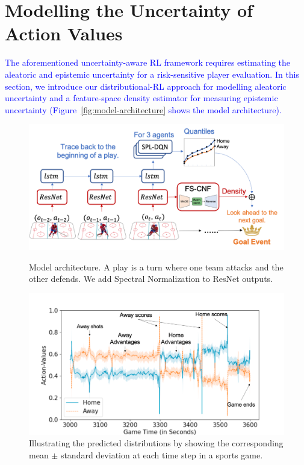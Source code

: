 \documentclass{article}
\begin{document}
\section{Modelling the Uncertainty of Action Values }\label{Sec:action-value-function}
\vspace{-0.05in}
\textcolor{blue}{The aforementioned uncertainty-aware RL framework requires estimating the aleatoric and epistemic uncertainty for a risk-sensitive player evaluation. In this section, we introduce our distributional-RL approach for modelling aleatoric uncertainty and a feature-space density estimator for measuring epistemic uncertainty (Figure~\ref{fig:model-architecture} shows the model architecture).}
\begin{figure}[htbp]
\vspace{-0.15in}
\begin{minipage}[t]{0.51\textwidth}
    \hspace{-0.25in}\includegraphics[scale=0.35]{figures/ice-hockey-net.png}
    \captionsetup{width=.95\linewidth}
    \caption{Model architecture. A play is a turn where one team attacks and the other defends. We add Spectral Normalization to ResNet outputs.}
    \label{fig:model-architecture}
\end{minipage}%
\begin{minipage}[t]{0.49\textwidth}
    \centering
    \includegraphics[scale=0.24]{figures/temporal-visualization-marked.png}
    \captionsetup{width=.95\linewidth}
    \caption{Illustrating the predicted distributions by showing the corresponding mean $\pm$ standard deviation at each time step in a sports game.}
    \label{fig:temporal-plot}
\end{minipage}
\vspace{-0.2in}
\end{figure}
\end{document}
